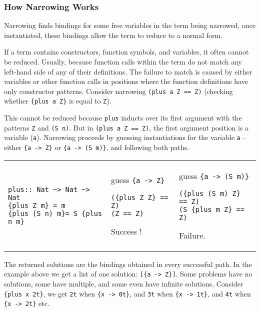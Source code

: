 \documentclass[11pt,twoside]{article}
\begin{document}
\subsubsection{How Narrowing Works}

Narrowing finds bindings for some
free variables in the term being narrowed, once
instantiated, these bindings allow the term to reduce to a
normal form.

If a term contains constructors, function symbols, and
variables, it often cannot be reduced. Usually, because
function calls within the term do not match any left-hand
side of any of their definitions. The failure to match is
caused by either variables or other function calls in
positions where the function definitions have only
constructor patterns. Consider narrowing {\tt ({plus a Z} ==
Z)} (checking whether \verb+{plus a Z}+ is equal to \verb+Z+). 

This cannot be reduced because {\tt plus} inducts over
its first argument with the patterns {\tt Z} and {\tt (S n)}.
But in {\tt ({plus a Z} == Z)}, the first argument position
is a variable ({\tt a}).  Narrowing proceeds by
guessing instantiations for the variable {\tt a} -- 
either \verb+{a -> Z}+ or \verb+{a -> (S m)}+,
and following both paths.

\vspace*{.20in}
\begin{tabular}{l|l|l}
\begin{minipage}[t]{2.25in}
{ %
\begin{verbatim}
plus:: Nat ~> Nat ~> Nat
{plus Z m} = m
{plus (S n) m}= S {plus n m}
\end{verbatim}}
\end{minipage}
&
\begin{minipage}[t]{1.5in}
{ %
guess \verb+{a -> Z}+
\begin{verbatim}
({plus Z Z} == Z)
(Z == Z)
\end{verbatim}}
Success !
\end{minipage}
&
\begin{minipage}[t]{1.6in}
{ %
guess \verb+{a -> (S m)}+
\begin{verbatim}
({plus (S m) Z} == Z)
(S {plus m Z} == Z)
\end{verbatim}}
Failure. 
\end{minipage}
\end{tabular}

\vspace*{0.15in}

The returned solutions are the bindings obtained in every
successful path. In the example above we get a list of one
solution: \verb+[{a -> Z}]+. Some problems have no
solutions, some have multiple, and some even have infinite
solutions. Consider  \verb+{plus x 2t}+, we get
\verb+2t+ when \verb+{x -> 0t}+, and 
\verb+3t+ when \verb+{x -> 1t}+, and
\verb+4t+ when \verb+{x -> 2t}+ etc.
\end{document}

